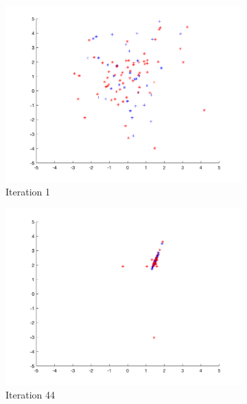 \begin{figure}
  \begin{subfigure}[b]{0.4\textwidth}
    \includegraphics[width=\textwidth]{img/smpl/rosn2d-2-100/loa-iter-1}
    \caption{Iteration 1}
    \label{fig:s5-iter-0}
  \end{subfigure}
  \begin{subfigure}[b]{0.4\textwidth}
    \includegraphics[width=\textwidth]{img/smpl/rosn2d-2-100/loa-iter-44}
    \caption{Iteration 44}
    \label{fig:s5-iter-1}
  \end{subfigure}
  \begin{subfigure}[b]{0.4\textwidth}

\end{subfigure}
\end{figure}

